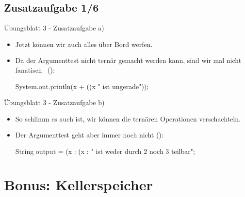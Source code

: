 \subsection{Zusatzaufgabe 1/6}
\begin{frame}[t,fragile]{Übungsblatt 3 - Zusatzaufgabe a)}
    \begin{itemize}[<+(1)->]
        \item Jetzt können wir auch alles über Bord werfen.
        \item Da der Argumenttest nicht ternär gemacht werden kann, sind wir mal nicht fanatisch \Laughey\ ():
\begin{plainjava}
System.out.println(x + ((x %
                    " ist ungerade"));
\end{plainjava}
    \end{itemize}
\end{frame}

\begin{frame}[t,fragile]{Übungsblatt 3 - Zusatzaufgabe b)}
    \begin{itemize}[<+(1)->]
        \item So schlimm es auch ist, wir können die ternären Operationen verschachteln.
        \item Der Argumenttest geht aber immer noch nicht ():
\begin{plainjava}
String output = (x %
        : (x %
        : " ist weder durch 2 noch 3 teilbar";
\end{plainjava}
    \end{itemize}
\end{frame}

\iffull
\section{Bonus: Kellerspeicher}

\def\bk#1#2{%
\scalebox{.65}{\begin{tikzpicture}
\foreach[count=\i] \a in {#1} {
    \node[block] (\i) at(\i*.7cm,0) {\a};
    \node[below,gray,font=\footnotesize\sffamily] at (\i.south) {\the\numexpr\i-1\relax};
}
\node[left=.55cm,N] (arr) at (1.west) {\bjava{int[] arr}: };

\node[above,yshift=.15cm] at(\the\numexpr#2+1\relax.north) {\faCaretDown};
\node[above left,yshift=.15cm,N] at(arr.north east) {\bjava{pointer = #2}};
\end{tikzpicture}}%
}

